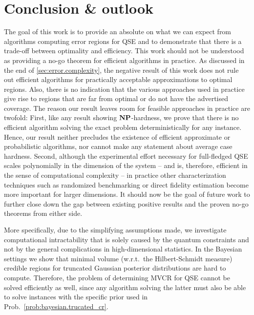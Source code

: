 \section{Conclusion \& outlook}
\label{sec:error.outlook}

The goal of this work is to provide an absolute  on what we can expect from algorithms computing error regions for QSE and to demonstrate that there is a trade-off between optimality and efficiency.
This work should not be understood as providing a no-go theorem for efficient algorithms in practice.
As discussed in the end of \cref{sec:error.complexity}, the negative result of this work does not rule out efficient algorithms for practically acceptable approximations to optimal regions.
Also, there is no indication that the various approaches used in practice give rise to regions that are far from optimal or do not have the advertised coverage.
The reason our result leaves room for feasible approaches in practice are twofold:
First, like any result showing $\mathbf{NP}$-hardness, we prove that there is no efficient algorithm solving the exact problem deterministically for any instance.
Hence, our result neither precludes the existence of efficient approximate or probabilistic algorithms, nor cannot make any statement about average case hardness.
Second, although the experimental effort necessary for full-fledged QSE scales polynomially in the dimension of the system -- and is, therefore, efficient in the sense of computational complexity -- in practice other characterization techniques such as randomized benchmarking or direct fidelity estimation become more important for larger dimensions.
It should now be the goal of future work to further close down the gap between existing positive results and the proven no-go theorems from either side.

More specifically, due to the simplifying assumptions made, we investigate computational intractability that is solely caused by the quantum constraints and not by the general complications in high-dimensional statistics.
In the Bayesian settings we show that minimal volume (w.r.t.\ the Hilbert-Schmidt measure) credible regions for truncated Gaussian posterior distributions are hard to compute.
Therefore, the problem of determining MVCR for QSE cannot be solved efficiently as well, since any algorithm solving the latter must also be able to solve instances with the specific prior used in Prob.~\ref{prob:bayesian.trucated_cr}.

